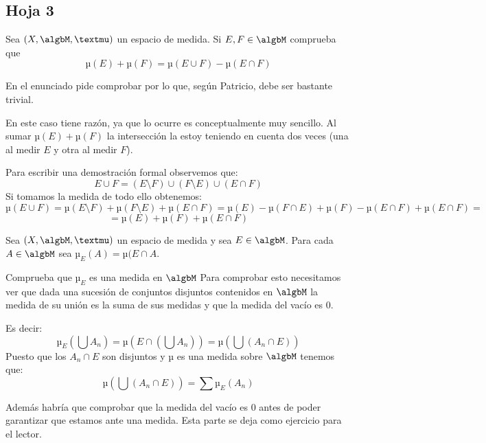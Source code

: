 \subsection{Hoja 3}
\begin{problem}
Sea $(X, \algbM, µ)$ un espacio de medida. Si $E,F \in \algbM$ comprueba que 
\[µ(E)+µ(F)=µ(E\cup F) - µ (E\cap F)\]

\solution
En el enunciado pide comprobar por lo que, según Patricio, debe ser bastante trivial.

En este caso tiene razón, ya que lo ocurre es conceptualmente muy sencillo. Al sumar $µ(E)+µ(F)$ la intersección la estoy teniendo en cuenta dos veces (una al medir $E$ y otra al medir $F$).

Para escribir una demostración formal observemos que:
\[E \cup F = (E \setminus F) \cup (F\setminus E) \cup (E \cap F)\]
Si tomamos la medida de todo ello obtenemos:
\[µ(E \cup F) = µ(E \setminus F) + µ(F\setminus E) + µ(E \cap F) = µ(E)-µ(F\cap E)+µ(F)-µ(E \cap F)+µ(E \cap F) =\]
\[= µ(E) + µ (F) +µ (E \cap F)\]
\end{problem}

\begin{problem}
Sea $(X, \algbM, µ)$ un espacio de medida y sea $E \in \algbM$. Para cada $A \in \algbM$ sea $µ_E(A)=µ(E\cap A$. 

Comprueba que $µ_E$ es una medida en $\algbM$
\solution
Para comprobar esto necesitamos ver que dada una sucesión de conjuntos disjuntos contenidos en $\algbM$ la medida de su unión es la suma de sus medidas y que la medida del vacío es 0.

Es decir:
\[µ_E(\bigcup A_n)=µ(E \cap (\bigcup A_n)) = µ(\bigcup(A_n \cap E))\]
Puesto que los $A_n \cap E$ son disjuntos y $µ$ es una medida sobre $\algbM$ tenemos que:
\[µ(\bigcup(A_n \cap E))=\sum µ_E(A_n)\]

Además habría que comprobar que la medida del vacío es 0 antes de poder garantizar que estamos ante una medida. Esta parte se deja como ejercicio para el lector.
\end{problem}

